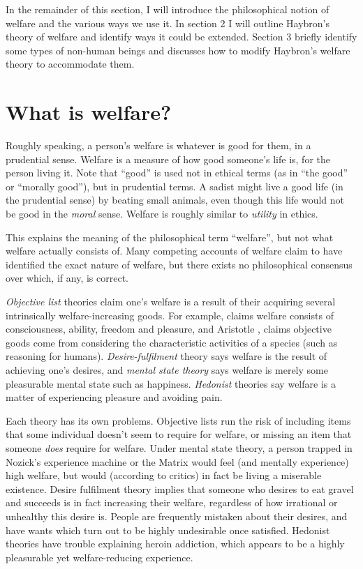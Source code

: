 \documentclass{article}
\begin{document}
In the remainder of this section, I will introduce the philosophical notion of welfare and the various ways we use it. In section 2 I will outline Haybron's theory of welfare and identify ways it could be extended. Section 3 briefly identify some types of non-human beings and discusses how to modify Haybron's welfare theory to accommodate them.

\section{What is welfare?}

Roughly speaking, a person's welfare is whatever is good for them, in a prudential sense. Welfare is a measure of how good someone's life is, for the person living it. Note that ``good'' is used not in ethical terms (as in ``the good'' or ``morally good''), but in prudential terms. A sadist might live a good life (in the prudential sense) by beating small animals, even though this life would not be good in the \textit{moral} sense. Welfare is roughly similar to \textit{utility} in ethics. 

This explains the meaning of the philosophical term ``welfare'', but not what welfare actually consists of. Many competing accounts of welfare claim to have identified the exact nature of welfare, but there exists no philosophical consensus over which, if any, is correct.

\textit{Objective list} theories claim one's welfare is a result of their acquiring several intrinsically welfare-increasing goods. For example, \citet{gert1998morality} claims welfare consists of consciousness, ability, freedom and pleasure, and Aristotle \nocite{joachim1951nichomachean}, claims objective goods come from considering the characteristic activities of a species (such as reasoning for humans). \textit{Desire-fulfilment} theory says welfare is the result of achieving one's desires, and \textit{mental state theory} says welfare is merely some pleasurable mental state such as happiness. \textit{Hedonist} theories say welfare is a matter of experiencing pleasure and avoiding pain. 

Each theory has its own problems. Objective lists run the risk of including items that some individual doesn't seem to require for welfare, or missing an item that someone \textit{does} require for welfare. Under mental state theory, a person trapped in Nozick's experience machine or the Matrix would feel (and mentally experience) high welfare, but would (according to critics) in fact be living a miserable existence. Desire fulfilment theory implies that someone who desires to eat gravel and succeeds is in fact increasing their welfare, regardless of how irrational or unhealthy this desire is. People are frequently mistaken about their desires, and have wants which turn out to be highly undesirable once satisfied. Hedonist theories have trouble explaining heroin addiction, which appears to be a highly pleasurable yet welfare-reducing experience. 
\end{document}
